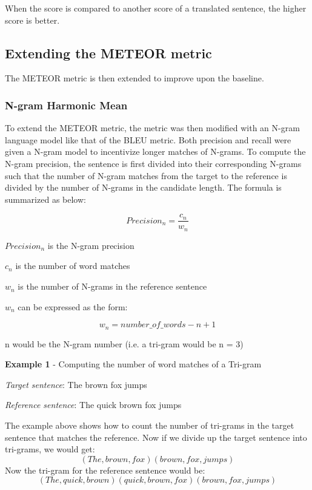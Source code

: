 \documentclass[11pt,letterpaper]{article}
\begin{document}
When the score is compared to another score of a translated sentence, the higher score is better.


\subsection{Extending the METEOR metric}
The METEOR metric is then extended to improve upon the baseline.
\subsubsection{N-gram Harmonic Mean}

To extend the METEOR metric, the metric was then modified with an N-gram language model like that of the BLEU metric. Both precision and recall were given a N-gram model to incentivize longer matches of N-grams. To compute the N-gram precision, the sentence is first divided into their corresponding N-grams such that the number of N-gram matches from the target to the reference is divided by the number of N-grams in the candidate length. The formula is summarized as below:

\begin{equation*}
	Precision_{n} = \frac{c_{n}}{w_{n}}
\end{equation*}

\(Precision_{n}\) is the N-gram precision

\(c_{n}\) is the number of word matches

\(w_{n}\) is the number of N-grams in the reference sentence

\(w_{n}\) can be expressed as the form:

\begin{equation*}
	w_{n} = number\_of\_words - n + 1
\end{equation*}

n would be the N-gram number (i.e. a tri-gram would be n = 3)
\smallskip

\textbf{Example 1} - Computing the number of word matches of a Tri-gram
\smallskip

\textit{Target sentence}: The brown fox jumps
\smallskip

\textit{Reference sentence}: The quick brown fox jumps
\smallskip

The example above shows how to count the number of tri-grams in the target sentence that matches the reference. Now if we divide up the target sentence into tri-grams, we would get:
\begin{equation*}
(The, brown, fox) (brown, fox, jumps) 
\end{equation*}
Now the tri-gram for the reference sentence would be:
\begin{equation*}
(The, quick, brown) (quick, brown, fox) (brown, fox, jumps)
\end{equation*}
\end{document}
